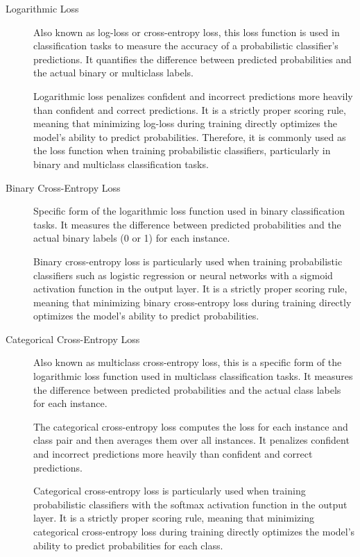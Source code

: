 \documentclass[a4paper]{report}
\begin{document}
\begin{description}
\item[Logarithmic Loss]
Also known as log-loss or cross-entropy loss, this loss function is used in classification tasks to measure the accuracy of a probabilistic classifier's predictions. It quantifies the difference between predicted probabilities and the actual binary or multiclass labels.

Logarithmic loss penalizes confident and incorrect predictions more heavily than confident and correct predictions. It is a strictly proper scoring rule, meaning that minimizing log-loss during training directly optimizes the model's ability to predict probabilities. Therefore, it is commonly used as the loss function when training probabilistic classifiers, particularly in binary and multiclass classification tasks.

\item[Binary Cross-Entropy Loss]
Specific form of the logarithmic loss function used in binary classification tasks. It measures the difference between predicted probabilities and the actual binary labels (0 or 1) for each instance.

Binary cross-entropy loss is particularly used when training probabilistic classifiers such as logistic regression or neural networks with a sigmoid activation function in the output layer. It is a strictly proper scoring rule, meaning that minimizing binary cross-entropy loss during training directly optimizes the model's ability to predict probabilities.

\item[Categorical Cross-Entropy Loss]
Also known as multiclass cross-entropy loss, this is a specific form of the logarithmic loss function used in multiclass classification tasks. It measures the difference between predicted probabilities and the actual class labels for each instance.

The categorical cross-entropy loss computes the loss for each instance and class pair and then averages them over all instances. It penalizes confident and incorrect predictions more heavily than confident and correct predictions. 

Categorical cross-entropy loss is particularly used when training probabilistic classifiers with the softmax activation function in the output layer. It is a strictly proper scoring rule, meaning that minimizing categorical cross-entropy loss during training directly optimizes the model's ability to predict probabilities for each class.


\end{description}
\end{document}
